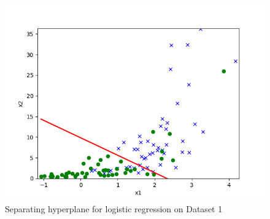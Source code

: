 \begin{answer}
	\begin{figure}[H]
		\centering
		\vspace{2mm}
		\includegraphics[width=0.65\linewidth]{../src/linearclass/logreg_pred_1.png}
        \caption{Separating hyperplane for logistic regression on Dataset 1}
	\end{figure}

\end{answer}
